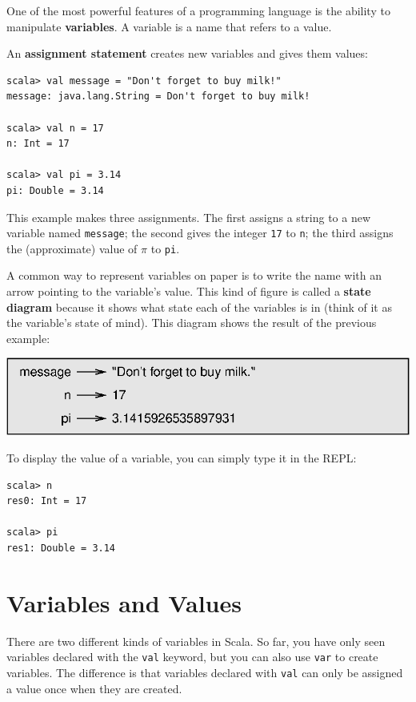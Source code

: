 \documentclass[10pt]{book}
\begin{document}
One of the most powerful features of a programming language is the
ability to manipulate {\bf variables}.  A variable is a name that
refers to a value.

An {\bf assignment statement} creates new variables and gives
them values:

\beforeverb
\begin{verbatim}
scala> val message = "Don't forget to buy milk!"
message: java.lang.String = Don't forget to buy milk!

scala> val n = 17
n: Int = 17

scala> val pi = 3.14
pi: Double = 3.14
\end{verbatim}
\afterverb

This example makes three assignments.  The first assigns a string
to a new variable named {\tt message};
the second gives the integer {\tt 17} to {\tt n}; the third
assigns the (approximate) value of $\pi$ to {\tt pi}.


A common way to represent variables on paper is to write the name with
an arrow pointing to the variable's value.  This kind of figure is
called a {\bf state diagram} because it shows what state each of the
variables is in (think of it as the variable's state of mind).
This diagram shows the result of the previous example:

\beforefig
\centerline{\includegraphics{figs/state2.eps}}
\afterfig

To display the value of a variable, you can simply type it in the REPL:

\beforeverb
\begin{verbatim}
scala> n
res0: Int = 17

scala> pi
res1: Double = 3.14
\end{verbatim}
\afterverb

\section{Variables and Values}


There are two different kinds of variables in Scala. So far, you have only seen variables declared with the \verb#val# keyword,
but you can also use \verb#var# to create variables. The difference is that variables declared with \verb#val# can only be assigned a value once
when they are created. 
\end{document}
